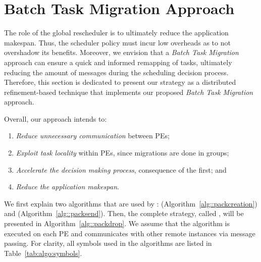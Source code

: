 \section{Batch Task Migration Approach} \label{sec:algo}



The role of the global rescheduler is to ultimately reduce the application makespan. 
Thus, the scheduler policy must incur low overheads as to not overshadow its benefits. 
Moreover, we envision that a \textit{Batch Task Migration} approach can ensure a quick and informed remapping of tasks, ultimately reducing the amount of messages during the scheduling decision process. 
Therefore, this section is dedicated to present our \packdrop strategy as a distributed refinement-based technique that implements our proposed \textit{Batch Task Migration} approach.

Overall, our approach intends to:

\begin{enumerate}
	\item \textit{Reduce unnecessary communication} between PEs;
	\item \textit{Exploit task locality} within PEs, since migrations are done in groups;
	\item \textit{Accelerate the decision making process}, consequence of the first; and
	\item \textit{Reduce the application makespan}.
\end{enumerate}

We first explain two algorithms that are used by \packdrop: \batchassembly (Algorithm~\ref{alg::packcreation}) and \batchsend (Algorithm~\ref{alg::packsend}).
Then, the complete strategy, called \packdrop, will be presented in Algorithm~\ref{alg::packdrop}.
We assume that the \packdrop algorithm is executed on each PE and communicates with other remote \packdrop instances via message passing.
For clarity, all symbols used in the algorithms are listed in Table~\ref{tab:algo:symbols}.

